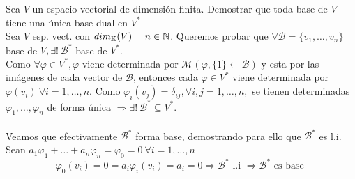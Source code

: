 \documentclass[12pt]{article}
\begin{document}
    \begin{ejercicio}[3 puntos] Sea $V$ un espacio vectorial de dimensión finita. Demostrar que toda base de $V$ tiene una única base dual en $V^*$ \\

    \noindent
    Sea $V$ esp. vect. con  $dim_{\mathbb{K}}(V) = n \in {\mathbb{N}}$. Queremos probar que $\forall \mathcal{B} = \{v_1, \dotsc, v_n\}$ base de $V, \exists! \ \mathcal{B^*}$ base de $V^*$. \\
    Como $\forall \varphi \in V^*, \varphi$ viene determinada por $\mathcal{M}(\varphi, \{1\} \leftarrow \mathcal{B})$ y esta por las imágenes de cada vector de $\mathcal{B}$, entonces cada $\varphi \in V^*$ viene determinada por $\varphi(v_i) \ \forall i = 1,\dotsc, n$. Como $\varphi_i(v_j) = \delta_{ij}, \forall i, j = 1,\dotsc, n,$ se tienen determinadas $\varphi_1,\dotsc,\varphi_n$  de forma única $\Rightarrow \exists! \ \mathcal{B^*} \subseteq V^*$. \\\\ Veamos que efectivamente $\mathcal{B^*}$ forma base, demostrando para ello que $\mathcal{B^*}$ es l.i. Sean $a_1\varphi_1 + \dotsc+ a_n\varphi_n = \varphi_0 = 0 \ \forall i = 1,\dotsc,n$
    \begin{equation*}
        \varphi_0(v_i) = 0 = a_i\varphi_i(v_i) = a_i = 0 \Rightarrow \mathcal{B^*} \text{ l.i } \Rightarrow \mathcal{B^*} \text{ es base } 
    \end{equation*}
    \end{ejercicio}
\end{document}
